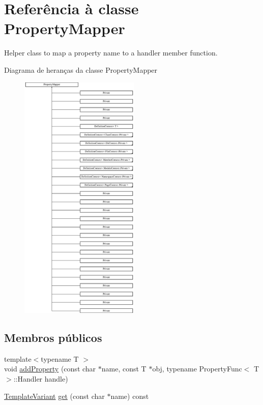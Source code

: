 \hypertarget{class_property_mapper}{\section{Referência à classe Property\-Mapper}
\label{class_property_mapper}
}


Helper class to map a property name to a handler member function.  


Diagrama de heranças da classe Property\-Mapper\begin{figure}[H]
\begin{center}
\leavevmode
\includegraphics[height=12.000000cm]{class_property_mapper}
\end{center}
\end{figure}
\subsection*{Membros públicos}
\begin{DoxyCompactItemize}
\item 
{\footnotesize template$<$typename T $>$ }\\void \hyperlink{class_property_mapper_a2cbd46fbe5fa152c98e3045347fe7578}{add\-Property} (const char $\ast$name, const T $\ast$obj, typename Property\-Func$<$ T $>$\-::Handler handle)
\item 
\hyperlink{class_template_variant}{Template\-Variant} \hyperlink{class_property_mapper_a1bcfea01201f3ea09981a8442842c42d}{get} (const char $\ast$name) const 
\end{DoxyCompactItemize}


